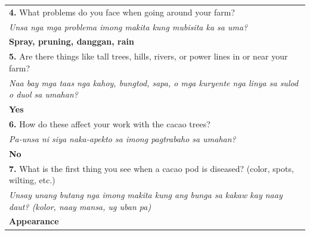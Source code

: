 {\begin{longtable}{|p{4cm}|p{10cm}|}
		\multicolumn{2}{|p{12cm}|}{\vspace{0.1cm} \textbf{4.} What problems do you face when going around your farm?}                                                                          \\
		\multicolumn{2}{|p{12cm}|}{\textit{Unsa nga mga problema imong makita kung mubisita ka sa uma?}}                                                                                       \\
		\multicolumn{2}{|p{12cm}|}{\textbf{Spray, pruning, danggan, rain}}                                                                                                                     \\
		\multicolumn{2}{|p{12cm}|}{\vspace{0.1cm} \textbf{5.} Are there things like tall trees, hills, rivers, or power lines in or near your farm?}                                           \\
		\multicolumn{2}{|p{12cm}|}{\textit{Naa bay mga taas nga kahoy, bungtod, sapa, o mga kuryente nga linya sa sulod o duol sa umahan?}}                                                    \\
		\multicolumn{2}{|p{12cm}|}{\textbf{Yes}}                                                                                                                                               \\

		\multicolumn{2}{|p{12cm}|}{\vspace{0.1cm} \textbf{6.} How do these affect your work with the cacao trees?}                                                                             \\
		\multicolumn{2}{|p{12cm}|}{\textit{Pa-unsa ni siya naka-apekto sa imong pagtrabaho sa umahan?}}                                                                                        \\
		\multicolumn{2}{|p{12cm}|}{\textbf{No}}                                                                                                                                                \\

		\multicolumn{2}{|p{12cm}|}{\vspace{0.1cm} \textbf{7.} What is the first thing you see when a cacao pod is diseased? (color, spots, wilting, etc.)}                                     \\
		\multicolumn{2}{|p{12cm}|}{\textit{Unsay unang butang nga imong makita kung ang bunga sa kakaw kay naay daut? (kolor, naay mansa, ug uban pa)}}                                        \\
		\multicolumn{2}{|p{12cm}|}{\textbf{Appearance}}                                                                                                                                        \\


\end{longtable}}

